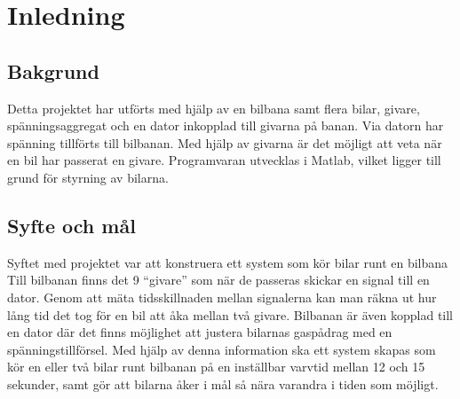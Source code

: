 \section{Inledning}

\subsection{Bakgrund}
Detta projektet har utförts med hjälp av en bilbana samt flera bilar, givare, spänningsaggregat och en dator inkopplad till givarna på banan. Via datorn har spänning tillförts till bilbanan. Med hjälp av givarna är det möjligt att veta när en bil har passerat en givare. Programvaran utvecklas i Matlab, vilket ligger till grund för styrning av bilarna. 

\subsection{Syfte och mål}
Syftet med projektet var att konstruera ett system som kör bilar runt en bilbana
Till bilbanan finns det 9 ``givare'' som när
de passeras skickar en signal till en dator. Genom att mäta tidsskillnaden
mellan signalerna kan man räkna ut hur lång tid det tog för en bil att åka
mellan två givare. Bilbanan är även kopplad till en dator där det finns
möjlighet att justera bilarnas gaspådrag med en spänningstillförsel. Med hjälp
av denna information ska ett system skapas som kör en eller två bilar runt
bilbanan på en inställbar varvtid mellan 12 och 15 sekunder, samt gör att
bilarna åker i mål så nära varandra i tiden som möjligt.
